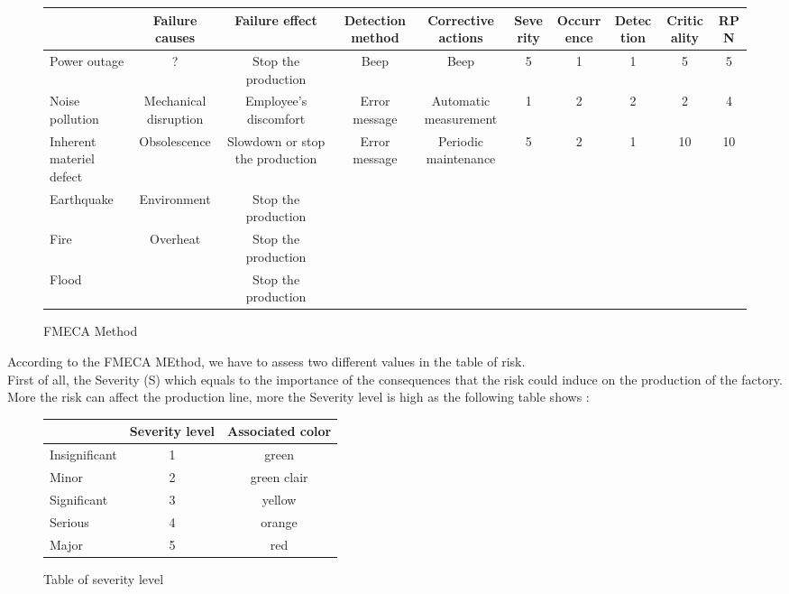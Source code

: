 \begin{figure}[h]
    \centering
    \begin{tabular}{| p{4cm} | c | c | c | c | c | c | c | c | c |}
        \hline
        \rowcolor{heading-color}\multicolumn{1}{|c|}{Failure mode} & Failure causes & Failure effect & Detection method & Corrective actions & Severity & Occurrence & Detection & Criticality & RPN\\
        \hline
        Power outage & ? & Stop the production & Beep & Beep & 5 & 1 & 1 & 5 & 5 \\
        \hline
        Noise pollution & Mechanical disruption & Employee's discomfort & Error message & Automatic measurement & 1 & 2 & 2 & 2 & 4 \\
        \hline
        Inherent materiel defect & Obsolescence & Slowdown or stop the production & Error message & Periodic maintenance & 5 & 2 & 1 & 10 & 10 \\
        \hline
        Earthquake & Environment & Stop the production &  &  &  &  &  &  &  \\
        \hline
        Fire & Overheat & Stop the production &  &  &  &  &  &  &  \\
        \hline
        Flood &  & Stop the production &  &  &  &  &  &  &  \\
        \hline
    \end{tabular}
    \caption{FMECA Method}
    \end{figure}

According to the FMECA MEthod, we have to assess two different values in the table of risk.\\

First of all, the Severity (S) which equals to the importance of the consequences that the risk could induce on the production of the factory. More the risk can affect the production line, more the Severity level is high as the following table shows :

\begin{figure}[h]
    \centering
    \begin{tabular}{| p{4cm} | c | c |}
        \hline
        \rowcolor{heading-color}\multicolumn{1}{|c|}{Severity definition} & Severity level & Associated color\\
        \hline
        Insignificant & 1 & green  \\
        \hline
        Minor & 2 & green clair  \\
        \hline
        Significant & 3 & yellow  \\
        \hline
        Serious & 4 & orange  \\
        \hline
        Major & 5 & red  \\
        \hline
    \end{tabular}
    \caption{Table of severity level}
\end{figure}

